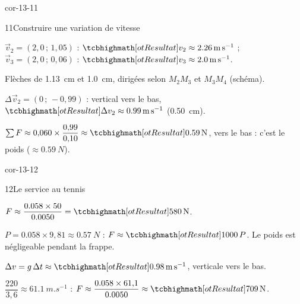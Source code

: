 \begin{blocLivre}{cor-13-11}
\begin{corrige}{11}{Construire une variation de vitesse}
\begin{questions}
\item $\vec{v}_2=(2{,}0\,;\,1{,}05)$ : $\res{v_2\approx\qty{2,26}{m.s^{-1}}}$ ; $\vec{v}_3=(2{,}0\,;\,0{,}06)$ : $\res{v_3\approx\qty{2,0}{m.s^{-1}}}$.
\item Flèches de \qty{1,13}{cm} et \qty{1,0}{cm}, dirigées selon $M_2M_3$ et $M_3M_4$ (schéma).
\item $\Delta\vec{v}_2=(0\,;\,-0{,}99)$ : vertical vers le bas, $\res{\Delta v_2\approx\qty{0,99}{m.s^{-1}}}$ (\qty{0,50}{cm}).
\item $\sum F\approx0{,}060\times\dfrac{0{,}99}{0{,}10}\approx\res{\qty{0,59}{N}}$, vers le bas : c'est le poids ($\approx\qty{0,59}{N}$).
\end{questions}
\end{corrige}
\end{blocLivre}
\begin{blocLivre}{cor-13-12}
\begin{corrige}{12}{Le service au tennis}
\begin{questions}
\item $F\approx\dfrac{\num{0,058}\times50}{\num{0,0050}}=\res{\qty{580}{N}}$.
\item $P=\num{0,058}\times9{,}81\approx\qty{0,57}{N}$ : $F\approx\res{1000\,P}$. Le poids est négligeable pendant la frappe.
\item $\Delta v=g\,\Delta t\approx\res{\qty{0,98}{m.s^{-1}}}$, verticale vers le bas.
\item $\dfrac{220}{3{,}6}\approx\qty{61,1}{m.s^{-1}}$ : $F\approx\dfrac{\num{0,058}\times61{,}1}{\num{0,0050}}\approx\res{\qty{709}{N}}$.
\end{questions}
\end{corrige}
\end{blocLivre}
